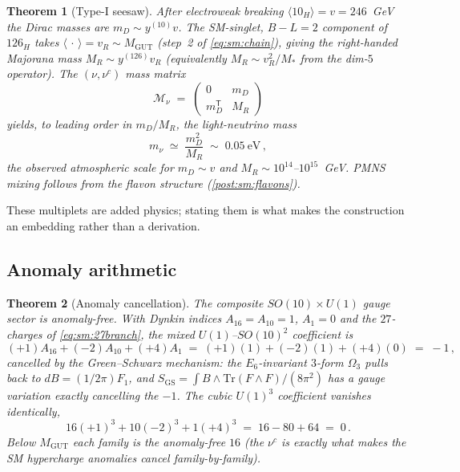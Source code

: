 \documentclass[11pt]{article}
\theoremstyle{plain}
\newtheorem{theorem}{Theorem}[section]
\theoremstyle{definition}
\theoremstyle{remark}
\begin{document}
\begin{theorem}[Type-I seesaw]\label{thm:sm:seesaw}
After electroweak breaking $\langle 10_H\rangle=v=246$~GeV the Dirac masses are
$m_D\sim y^{(10)}v$. The SM-singlet, $B\!-\!L=2$ component of $126_H$ takes
$\langle\,\cdot\,\rangle=v_R\sim M_{\mathrm{GUT}}$ (step~2 of \eqref{eq:sm:chain}),
giving the right-handed Majorana mass $M_R\sim y^{(126)}v_R$ (equivalently
$M_R\sim v_R^2/M_*$ from the dim-$5$ operator). The $(\nu,\nu^c)$ mass matrix
\begin{equation}\label{eq:sm:matrix}
\mathcal{M}_\nu \;=\;
\begin{pmatrix} 0 & m_D \\ m_D^{\mathsf T} & M_R \end{pmatrix}
\end{equation}
yields, to leading order in $m_D/M_R$, the light-neutrino mass
\begin{equation}\label{eq:sm:mnu}
m_\nu \;\simeq\; \frac{m_D^2}{M_R} \;\sim\; 0.05\ \mathrm{eV}\,,
\end{equation}
the observed atmospheric scale for $m_D\sim v$ and $M_R\sim 10^{14}$--$10^{15}$~GeV.
PMNS mixing follows from the flavon structure (\autoref{post:sm:flavons}).
\end{theorem}

These multiplets are added physics; stating them is what makes the construction an
embedding rather than a derivation.

\subsection{Anomaly arithmetic}
\label{sec:sm:anomaly}

\begin{theorem}[Anomaly cancellation]\label{thm:sm:anomaly}
The composite $SO(10)\times U(1)$ gauge sector is anomaly-free. With Dynkin indices
$A_{16}=A_{10}=1$, $A_1=0$ and the $27$-charges of \eqref{eq:sm:27branch}, the mixed
$U(1)$--$SO(10)^2$ coefficient is
\begin{equation}\label{eq:sm:mixed}
(+1)A_{16}+(-2)A_{10}+(+4)A_1
 \;=\;(+1)(1)+(-2)(1)+(+4)(0)\;=\;-1\,,
\end{equation}
cancelled by the Green--Schwarz mechanism: the $E_6$-invariant $3$-form $\Omega_3$
pulls back to $dB=(1/2\pi)F_1$, and
$S_{\mathrm{GS}}=\int B\wedge \mathrm{Tr}(F\wedge F)/(8\pi^2)$ has a gauge variation
exactly cancelling the $-1$. The cubic $U(1)^3$ coefficient vanishes identically,
\begin{equation}\label{eq:sm:cubic}
16(+1)^3+10(-2)^3+1(+4)^3 \;=\; 16-80+64 \;=\; 0\,.
\end{equation}
Below $M_{\mathrm{GUT}}$ each family is the anomaly-free $16$ (the $\nu^c$ is exactly
what makes the SM hypercharge anomalies cancel family-by-family).
\end{theorem}
\end{document}
